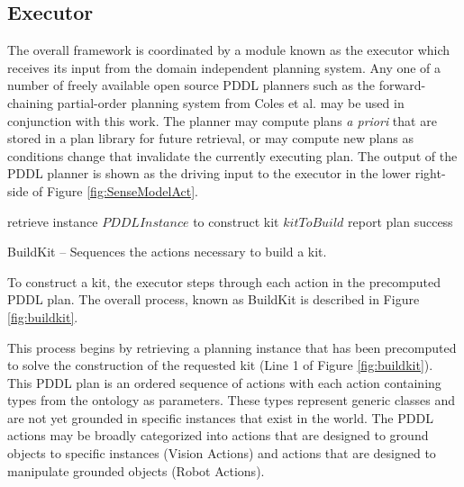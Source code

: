 \subsection{Executor}
The overall framework
is coordinated by a module known as the executor
which receives its input from the 
domain independent planning system. 
Any one of a number of freely available
open source PDDL planners
such as the forward-chaining partial-order planning system from 
Coles et al. \cite{Coles.ICAPS.2010}
may be used in conjunction with this 
work. The planner may compute plans {\it a priori} that are
stored in a plan library for future retrieval, or may compute
new plans as conditions change that invalidate the currently
executing plan. The output of the PDDL planner is shown as
the driving input to the executor in the lower right-side of
Figure \ref{fig:SenseModelAct}.

%
\begin{algorithm}[h!]

 	retrieve instance $PDDLInstance$ to construct kit $kitToBuild$\;
 	report plan success\;
\caption{{\sc BuildKit} -- Sequences the actions necessary to build a kit.}
\label{fig:buildkit}
\end{algorithm}
%


To construct a kit, the executor steps through each
action in
the precomputed PDDL plan. The overall process, known as {\sc BuildKit} is described in Figure
\ref{fig:buildkit}. 

This process begins by retrieving a planning instance that has been 
precomputed to solve the construction of the requested kit (Line 1 of 
Figure \ref{fig:buildkit}). This PDDL
plan is an ordered sequence of actions with each action
containing types from the ontology as parameters. These
types represent generic classes and are not yet grounded
in specific instances that exist in the world. The PDDL
actions may be broadly categorized into actions that are
designed to ground objects to specific instances (Vision Actions)
and actions that are designed to manipulate grounded objects (Robot 
Actions). 

